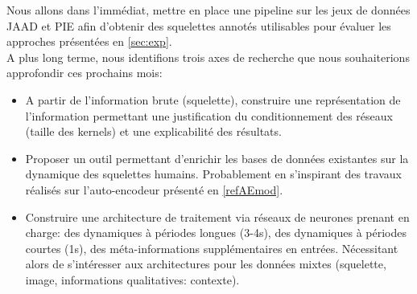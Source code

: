 Nous allons dans l’immédiat, mettre en place une pipeline sur les jeux de données JAAD et PIE afin d'obtenir des squelettes annotés utilisables pour évaluer les approches présentées en \ref{sec:exp}.\\

A plus long terme, nous identifions trois axes de recherche que nous souhaiterions approfondir ces prochains mois:
\begin{itemize}
    \item A partir de l'information brute (squelette), construire une représentation de l'information permettant une justification du conditionnement des réseaux (taille des kernels) et une explicabilité des résultats.
    \item Proposer un outil permettant d'enrichir les bases de données existantes sur la dynamique des squelettes humains. Probablement en s'inspirant des travaux réalisés sur l'auto-encodeur présenté en \ref{refAEmod}.
    \item Construire une architecture de traitement via réseaux de neurones prenant en charge: des dynamiques à périodes longues (3-4s), des dynamiques à périodes courtes (1s), des méta-informations supplémentaires en entrées. Nécessitant alors de s’intéresser aux architectures pour les données mixtes (squelette, image, informations qualitatives: contexte).
\end{itemize}



